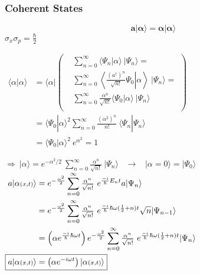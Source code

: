 \documentclass[12pt]{article}
\begin{document}
\newpage
\subsubsection{Coherent States}
\[ \boldsymbol{ a | \alpha \rangle = \alpha | \alpha \rangle } \]
\( \boxed{ \sigma_x \sigma_p = \frac{\hbar}{2} } \)\\[5pt]
\noindent
\begin{minipage}{.45\textwidth}
    \( \begin{aligned}
        \langle \alpha | \alpha \rangle 
            &= \langle \alpha | 
            \left( \begin{aligned}
                &\sum_{n=0}^\infty 
                    \langle \Psi_n | \alpha \rangle \ | \Psi_n \rangle =\\
                &\sum_{n=0}^\infty \left\langle \left. 
                    \frac{(a^\dagger)^n}{\sqrt{n!}} \Psi_0 \right| \alpha \right\rangle \ 
                    | \Psi_n \rangle = \\
                &\sum_{n=0}^\infty 
                    \frac{\alpha^n}{\sqrt{n!}} \langle \Psi_0 | \alpha \rangle
                    \ | \Psi_n \rangle\\
            \end{aligned} \right) \\[5pt]
        &= \langle \Psi_0 | \alpha \rangle^2 \sum_{n=0}^\infty
            \frac{ (\alpha^{2})^n}{n!} \ \langle \Psi_n|\Psi_n \rangle\\[5pt]
        &= \langle \Psi_0 | \alpha \rangle^2 \ e^{\alpha^{2}} = 1
    \end{aligned} \) 
\end{minipage}
\begin{minipage}{.5\textwidth}
    \( \displaystyle \Rightarrow \ \boxed{ \big| \alpha \big\rangle 
    = e^{- \alpha^{2} / 2} \ \sum_{n=0}^\infty 
    \tfrac{\alpha^n}{\sqrt{n!}} \ | \Psi_n \rangle } \) 
    \ \(\rightarrow\) \
    \( \big| \alpha {\scriptstyle =} 0 \big\rangle = | \Psi_0 \rangle \)\\[10pt]
    \( \begin{aligned}
        a | \alpha{\scriptstyle(x,t)} \rangle 
            &= e^{- \frac{\alpha^{2}}{2}} \sum_{n=0}^\infty 
            \tfrac{\alpha^n}{\sqrt{n!}} \ e^{\frac{-i}{\hbar} E_n t} a | \Psi_n \rangle\\
        &= e^{- \frac{\alpha^{2}}{2}} \sum_{n=0}^\infty 
            \tfrac{\alpha^n}{\sqrt{n!}} \ e^{\frac{-i}{\hbar} 
            \hbar \omega (\frac{1}{2} + n) t} \sqrt{n} | \Psi_{n-1} \rangle \\
        &= \left( \alpha e^{\frac{-i}{\hbar} \hbar \omega t} \right) e^{- \frac{\alpha^{2}}{2}}
            \sum_{n=0}^\infty \tfrac{\alpha^n}{\sqrt{n!}} \ e^{\frac{-i}{\hbar} 
            \hbar \omega (\frac{1}{2} + n) t} | \Psi_n \rangle\\
        \Aboxed{ a | \alpha{\scriptstyle(x,t)} \rangle 
            &= \left( \alpha e^{-i \omega t} \right) | \alpha{\scriptstyle(x,t)} \rangle }
    \end{aligned} \)
\end{minipage}
\end{document}
